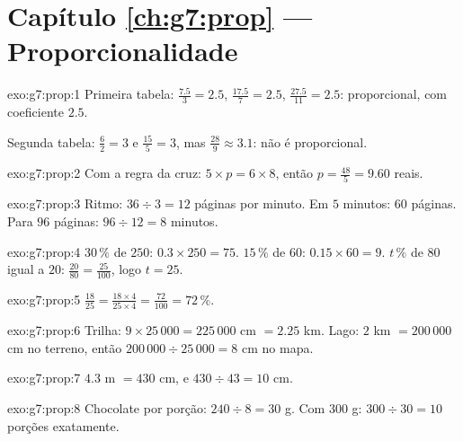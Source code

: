 \section*{Capítulo \ref{ch:g7:prop} --- Proporcionalidade}

\begin{solution}{exo:g7:prop:1}
Primeira tabela:  $\frac{7.5}{3} = 2.5$,
$\frac{17.5}{7} = 2.5$, $\frac{27.5}{11} = 2.5$: proporcional, com
coeficiente $2.5$.

Segunda tabela: $\frac62 = 3$ e $\frac{15}{5} = 3$, mas
$\frac{28}{9} \approx 3.1$: não é proporcional.
\end{solution}

\begin{solution}{exo:g7:prop:2}
Com a regra da cruz: $5 \times p = 6 \times 8$, então
$p = \frac{48}{5} = 9.60$ reais.
\end{solution}

\begin{solution}{exo:g7:prop:3}
Ritmo: $36 \div 3 = 12$ páginas por minuto. Em $5$ minutos: $60$
páginas. Para $96$ páginas: $96 \div 12 = 8$ minutos.
\end{solution}

\begin{solution}{exo:g7:prop:4}
$30\,\%$ de $250$: $0.3 \times 250 = 75$. \quad
$15\,\%$ de $60$: $0.15 \times 60 = 9$. \quad
$t\,\%$ de $80$ igual a $20$: $\frac{20}{80} = \frac{25}{100}$, logo
$t = 25$.
\end{solution}

\begin{solution}{exo:g7:prop:5}
$\frac{18}{25} = \frac{18 \times 4}{25 \times 4} = \frac{72}{100} =
72\,\%$.
\end{solution}

\begin{solution}{exo:g7:prop:6}
Trilha: $9 \times 25\,000 = 225\,000$ cm $= 2.25$ km. Lago: $2$ km
$= 200\,000$ cm no terreno, então $200\,000 \div 25\,000 = 8$ cm no
mapa.
\end{solution}

\begin{solution}{exo:g7:prop:7}
$4.3$ m $= 430$ cm, e $430 \div 43 = 10$ cm.
\end{solution}

\begin{solution}{exo:g7:prop:8}
Chocolate por porção: $240 \div 8 = 30$ g. Com $300$ g:
$300 \div 30 = 10$ porções exatamente.
\end{solution}

